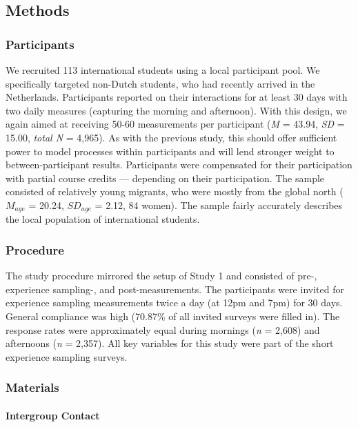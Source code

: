 \documentclass[man, 12pt, a4paper, mask]{apa7}
\theoremstyle{break}
\theoremstyle{plain}
\begin{document}
\subsection{Methods}

\subsubsection{Participants}

We recruited 113 international students using a local participant pool.
We specifically targeted non-Dutch students, who had recently arrived in
the Netherlands. Participants reported on their interactions for at
least 30 days with two daily measures (capturing the morning and
afternoon). With this design, we again aimed at receiving 50-60
measurements per participant (\textit{M} = 43.94, \textit{SD} = 15.00,
\textit{total N} = 4,965). As with the previous study, this should offer
sufficient power to model processes within participants and will lend
stronger weight to between-participant results. Participants were
compensated for their participation with partial course credits ---
depending on their participation. The sample consisted of relatively
young migrants, who were mostly from the global north (\(M_{age}\) =
20.24, \(SD_{age}\) = 2.12, 84 women). The sample fairly accurately
describes the local population of international students.

\subsubsection{Procedure}

The study procedure mirrored the setup of Study 1 and consisted of pre-,
experience sampling-, and post-measurements. The participants were
invited for experience sampling measurements twice a day (at 12pm and
7pm) for 30 days. General compliance was high (70.87\% of all invited
surveys were filled in). The response rates were approximately equal
during mornings (\textit{n} = 2,608) and afternoons (\textit{n} =
2,357). All key variables for this study were part of the short
experience sampling surveys.

\subsubsection{Materials}

\paragraph{Intergroup Contact}
\end{document}
